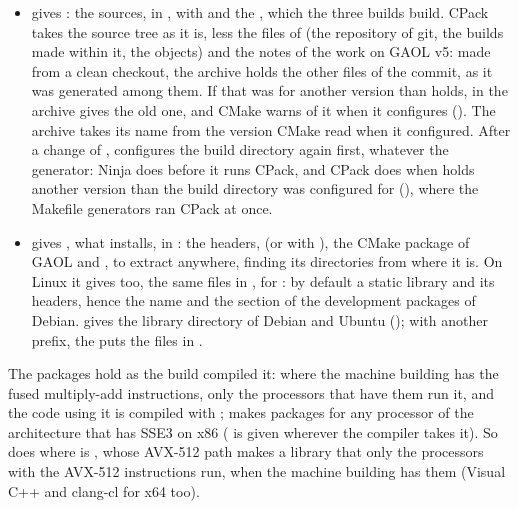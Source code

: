 \begin{itemize}
\item[$\bullet$] {\sloppy \textbf{} gives
  : the sources, in
  , with  and the
  , which the three builds build. CPack takes the source
  tree as it is, less the files of  (the
  repository of git, the builds made within it, the objects) and the
  notes of the work on GAOL v5: made from a clean checkout, the archive holds
  the other files of the commit,  as it was generated among
  them. If that was for another version than  holds,
   in the archive gives the old one, and CMake warns
  of it when it configures (). The archive takes
  its name from the version CMake read when it configured. After a change of
  ,  configures the build directory
  again first, whatever the generator: Ninja does before it runs CPack, and
  CPack does when  holds another version than the build
  directory was configured for (),
  where the Makefile generators ran CPack at once.\newinvfive\par}
\item[$\bullet$] \textbf{} gives
  , what 
  installs, in : the headers,
   (or  with ),
  the CMake package of GAOL and , to extract anywhere,
   finding its directories from where it is. On Linux it gives
   too,
  the same files in , for : by default a static library
  and its headers, hence the name and the section  of the
  development packages of Debian. 
  gives the library directory of Debian and Ubuntu
  (); with another prefix, the  puts
  the files in .
\end{itemize}

\noindent
The packages hold  as the build compiled it: where the machine
building has the fused multiply-add instructions, only the processors that
have them run it, and the code using it is compiled with ;
 makes packages for any processor of the
architecture that has SSE3 on x86 ( is given wherever the
compiler takes it). So does  where
 is , whose AVX-512 path makes a
library that only the processors with the AVX-512 instructions run, when the
machine building has them (Visual C++ and clang-cl for x64 too).\newinvfive

